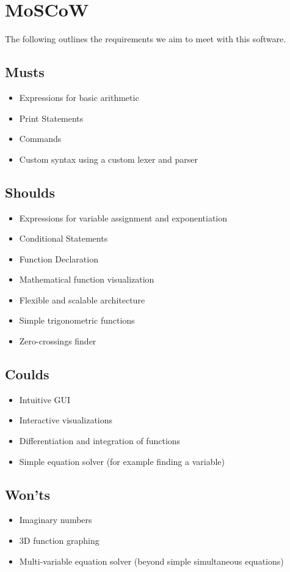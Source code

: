 \documentclass[a4paper, oneside, 11pt]{report}
\begin{document}
\section{MoSCoW}
The following outlines the requirements we aim to meet with this software.

\subsection{Musts}

\begin{itemize}
	\item Expressions for basic arithmetic
	\item Print Statements
	\item Commands
	\item Custom syntax using a custom lexer and parser
\end{itemize}

\subsection{Shoulds}

\begin{itemize}
	\item Expressions for variable assignment and exponentiation
	\item Conditional Statements
	\item Function Declaration
	\item Mathematical function visualization
	\item Flexible and scalable architecture
	\item Simple trigonometric functions
	\item Zero-crossings finder
\end{itemize}

\subsection{Coulds}
\begin{itemize}
	\item Intuitive GUI
	\item Interactive visualizations
	\item Differentiation and integration of functions
	\item Simple equation solver (for example finding a variable)
\end{itemize}

\subsection{Won'ts}
\begin{itemize}
	\item Imaginary numbers
	\item 3D function graphing
	\item Multi-variable equation solver (beyond simple simultaneous equations)
\end{itemize}
\end{document}
